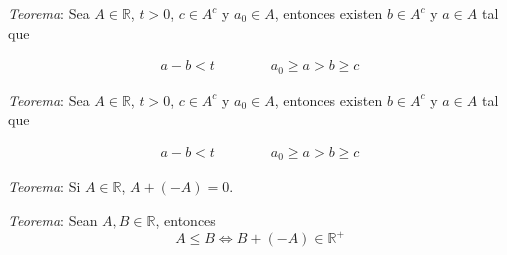 \documentclass{beamer}
\begin{document}
  \begin{frame}

    \textit{Teorema}: Sea $A \in \mathbb{R}$, $t > 0$, $c \in A^c$ y $a_0 \in A$, entonces existen 
    $b \in A^c$ y $a \in A$ tal que 

    \begin{equation*}
      \begin{aligned}
        a - b < t \qquad\qquad a_0 \ge a > b \ge c
      \end{aligned}
    \end{equation*}

  \end{frame}

  \begin{frame}

    \textit{Teorema}: Sea $A \in \mathbb{R}$, $t > 0$, $c \in A^c$ y $a_0 \in A$, entonces existen 
    $b \in A^c$ y $a \in A$ tal que 

    \begin{equation*}
      \begin{aligned}
        a - b < t \qquad\qquad a_0 \ge a > b \ge c
      \end{aligned}
    \end{equation*}
    \newline\newline

    \textit{Teorema}: Si $A \in \mathbb{R}$, $A + (-A) = 0$.
  \end{frame}

  \begin{frame}

    \textit{Teorema}: Sean $A, B \in \mathbb{R}$, entonces 
    \[A \leq B \iff B + (-A) \in \mathbb{R}^+\]
  \end{frame}
\end{document}
